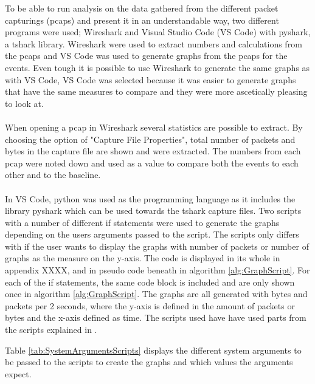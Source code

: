 To be able to run analysis on the data gathered from the different packet capturings (pcaps) and present it in an understandable way, two different programs were used; Wireshark and Visual Studio Code (VS Code) with pyshark, a tshark library. Wireshark were used to extract numbers and calculations from the pcaps and VS Code was used to generate graphs from the pcaps for the events. Even tough it is possible to use Wireshark to generate the same graphs as with VS Code, VS Code was selected because it was easier to generate graphs that have the same measures to compare and they were more ascetically pleasing to look at.
\\\\
When opening a pcap in Wireshark several statistics are possible to extract. By choosing the option of "Capture File Properties", total number of packets and bytes in the capture file are shown and were extracted. The numbers from each pcap were noted down and used as a value to compare both the events to each other and to the baseline. 
\\\\
In VS Code, python was used as the programming language as it includes the library pyshark which can be used towards the tshark capture files. Two scripts with a number of different if statements were used to generate the graphs depending on the users arguments passed to the script. The scripts only differs with if the user wants to display the graphs with number of packets or number of graphs as the measure on the y-axis. The code is displayed in its whole in appendix XXXX, and in pseudo code beneath in algorithm \ref{alg:GraphScript}. For each of the if statements, the same code block is included and are only shown once in algorithm \ref{alg:GraphScript}. The graphs are all generated with bytes and packets per 2 seconds, where the y-axis is defined in the amount of packets or bytes and the x-axis defined as time. The scripts used have have used parts from the scripts explained in \cite{GraphsInspiration}.

Table \ref{tab:SystemArgumentsScripts} displays the different system arguments to be passed to the scripts to create the graphs and which values the arguments expect. 

